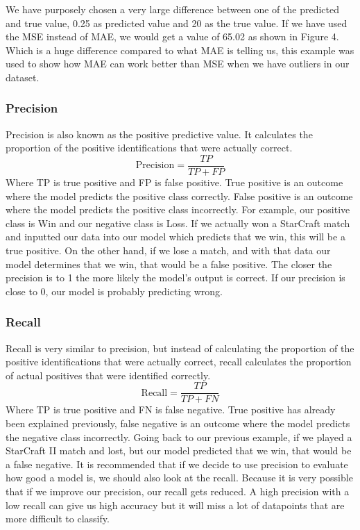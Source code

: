 \documentclass[a4paper,12pt]{report}
\begin{document}

We have purposely chosen a very large difference between one of the predicted and true value, 0.25 as predicted value and 20 as the true value. If  we have used the MSE instead of MAE, we would get a value of 65.02 as shown in Figure 4. Which is a huge difference compared to what MAE is telling us, this example was used to show how MAE can work better than MSE when we have outliers in our dataset.

 
\subsubsection{Precision}

Precision is also known as the positive predictive value. It calculates the proportion of the positive identifications that were actually correct.
$$\text{Precision}=\frac{TP}{TP+FP}$$
Where TP  is true positive and FP is false positive. True positive is an outcome where the model predicts the positive class correctly. False positive is an outcome where the model predicts the positive class incorrectly. For example, our positive class is Win and our negative class is Loss. If we actually won a StarCraft match and inputted our data into our model which predicts that we win, this will be a true positive. On the other hand, if we lose a match, and with that data our model determines that we win, that would be a false positive. The closer the precision is to 1 the more likely the model’s output is correct. If our precision is close to 0, our model is probably predicting wrong.
 
\subsubsection{Recall}

Recall is very similar to precision, but instead of calculating the proportion of the positive identifications that were actually correct, recall calculates the proportion of actual positives that were identified correctly.
$$\text{Recall}=\frac{TP}{TP+FN}$$
Where TP is true positive and FN is false negative. True positive has already been explained previously, false negative is an outcome where the model predicts the negative class incorrectly. Going back to our previous example, if we played a StarCraft II match and lost, but our model predicted that we win, that would be a false negative. It is recommended that if we decide to use precision to evaluate how good a model is, we should also look at the recall. Because it is very possible that if we improve our precision, our recall gets reduced. A high precision with a low recall can give us high accuracy but it will miss a lot of datapoints that are more difficult to classify.
 
\end{document}
